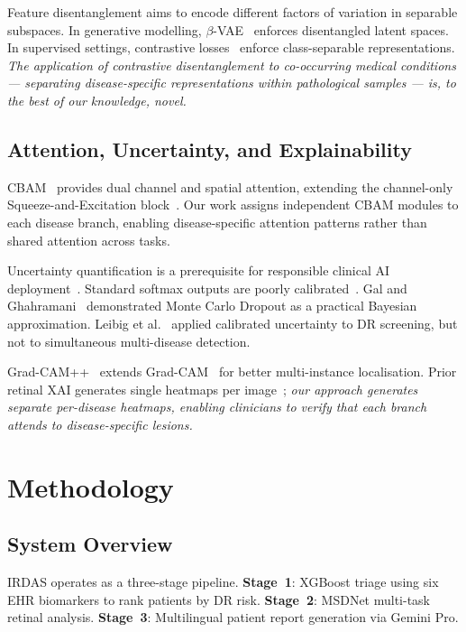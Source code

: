\documentclass[conference]{IEEEtran}
\begin{document}
Feature disentanglement aims to encode different factors of variation in separable subspaces. In generative modelling, $\beta$-VAE~\cite{higgins2017} enforces disentangled latent spaces. In supervised settings, contrastive losses~\cite{khosla2020} enforce class-separable representations. \textit{The application of contrastive disentanglement to co-occurring medical conditions --- separating disease-specific representations within pathological samples --- is, to the best of our knowledge, novel.}

\subsection{Attention, Uncertainty, and Explainability}

CBAM~\cite{woo2018} provides dual channel and spatial attention, extending the channel-only Squeeze-and-Excitation block~\cite{hu2018}. Our work assigns independent CBAM modules to each disease branch, enabling disease-specific attention patterns rather than shared attention across tasks.

Uncertainty quantification is a prerequisite for responsible clinical AI deployment~\cite{begoli2019}. Standard softmax outputs are poorly calibrated~\cite{guo2017}. Gal and Ghahramani~\cite{gal2016} demonstrated Monte Carlo Dropout as a practical Bayesian approximation. Leibig et al.~\cite{leibig2017} applied calibrated uncertainty to DR screening, but not to simultaneous multi-disease detection.

Grad-CAM++~\cite{chattopadhyay2018} extends Grad-CAM~\cite{selvaraju2017} for better multi-instance localisation. Prior retinal XAI generates single heatmaps per image~\cite{sayres2019}; \textit{our approach generates separate per-disease heatmaps, enabling clinicians to verify that each branch attends to disease-specific lesions.}

\section{Methodology}

\subsection{System Overview}

IRDAS operates as a three-stage pipeline. \textbf{Stage~1}: XGBoost triage using six EHR biomarkers to rank patients by DR risk. \textbf{Stage~2}: MSDNet multi-task retinal analysis. \textbf{Stage~3}: Multilingual patient report generation via Gemini Pro.
\end{document}
